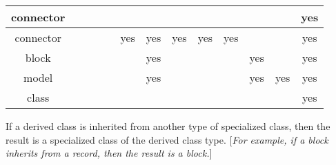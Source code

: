 \begin{table}[H]
{\begin{tabular}{|c|c|c|c|c|c|c|c|c|c|c|c|c|}
    connector         &                          &                           &                                            &                      &                          &                          &                          &                          &                            &                          &                        & \multirow{-2}{*}{\cellcolor{lightgray}yes} \\
    \hline
    connector         &                          &                           &                                            &                      & \cellcolor{lightgray}yes & \cellcolor{lightgray}yes & \cellcolor{lightgray}yes & \cellcolor{lightgray}yes & yes                        &                          &                        & \cellcolor{lightgray}yes                   \\
    \hline
    block             &                          &                           &                                            &                      &                          & \cellcolor{lightgray}yes &                          &                          &                            & yes                      &                        & \cellcolor{lightgray}yes                   \\
    \hline
    model             &                          &                           &                                            &                      &                          & \cellcolor{lightgray}yes &                          &                          &                            & \cellcolor{lightgray}yes & yes                    & \cellcolor{lightgray}yes                   \\
    \hline
    class             &                          &                           &                                            &                      &                          &                          &                          &                          &                            &                          &                        & yes                                        \\
    \hline
  \end{tabular}
  \ifpdf}\else\fi%
\end{table}


If a derived class is inherited from another type of specialized class,
then the result is a specialized class of the derived class type.
{[}\emph{For example, if a block inherits from a record, then the result
is a block.}{]}

